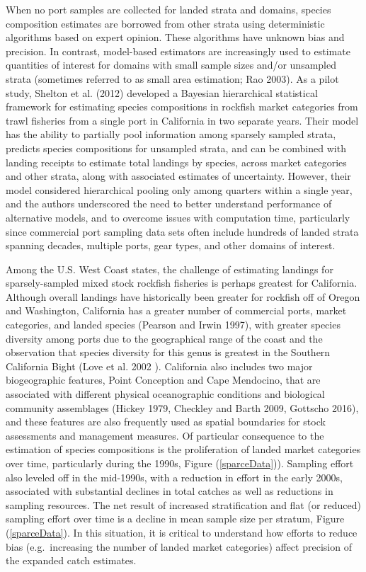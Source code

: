\documentclass[12pt]{article}
\begin{document}
When no port samples are collected for landed strata and domains,
species composition estimates are borrowed from other strata using
deterministic algorithms based on expert opinion. These algorithms have
unknown bias and precision. In contrast, model-based estimators are
increasingly used to estimate quantities of interest for domains with
small sample sizes and/or unsampled strata (sometimes referred to as
small area estimation; Rao 2003). As a pilot study, Shelton et al.
(2012) developed a Bayesian hierarchical statistical framework for
estimating species compositions in rockfish market categories from trawl
fisheries from a single port in California in two separate years. Their
model has the ability to partially pool information among sparsely
sampled strata, predicts species compositions for unsampled strata, and
can be combined with landing receipts to estimate total landings by
species, across market categories and other strata, along with
associated estimates of uncertainty. However, their model considered
hierarchical pooling only among quarters within a single year, and the
authors underscored the need to better understand performance of
alternative models, and to overcome issues with computation time,
particularly since commercial port sampling data sets often include
hundreds of landed strata spanning decades, multiple ports, gear types,
and other domains of interest.

Among the U.S. West Coast states, the challenge of estimating landings
for sparsely-sampled mixed stock rockfish fisheries is perhaps greatest
for California. Although overall landings have historically been greater
for rockfish off of Oregon and Washington, California has a greater
number of commercial ports, market categories, and landed species
(Pearson and Irwin 1997), with greater species diversity among ports due
to the geographical range of the coast and the observation that species
diversity for this genus is greatest in the Southern California Bight
(Love et al. 2002 ). California also includes two major biogeographic
features, Point Conception and Cape Mendocino, that are associated with
different physical oceanographic conditions and biological community
assemblages (Hickey 1979, Checkley and Barth 2009, Gottscho 2016), and
these features are also frequently used as spatial boundaries for stock
assessments and management measures. Of particular consequence to the
estimation of species compositions is the proliferation of landed market
categories over time, particularly during the 1990s, 
Figure (\ref{sparceData})). Sampling effort also leveled off in the mid-1990s, 
with a reduction in effort in the early 2000s, associated with 
substantial declines in total catches as well as reductions in sampling 
resources. The net result of increased stratification and flat (or 
reduced) sampling effort over time is a decline in mean sample size per 
stratum, Figure (\ref{sparceData}). In this situation, it is critical 
to understand how efforts to reduce bias (e.g.~increasing the number of landed 
market categories) affect precision of the expanded catch estimates.
\end{document}
